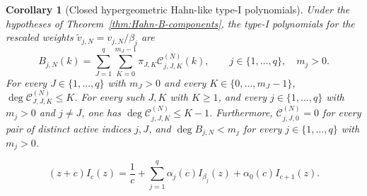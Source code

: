 \documentclass[10pt,a4paper]{amsart}
\newtheorem{corollary}{Corollary}
\begin{document}
\begin{corollary}[Closed hypergeometric Hahn-like type-I polynomials]
\label{cor:Hahn-B-closed-components}
Under the hypotheses of Theorem~\ref{thm:Hahn-B-components}, the type-I
polynomials for the rescaled weights
\(\widetilde v_{j,N}=v_{j,N}/\beta_j\) are
\begin{equation}
 B_{j,N}(k)=
 \sum_{J=1}^q\sum_{K=0}^{m_J-1}
 \pi_{J,K}\mathcal C_{j,J,K}^{(N)}(k),
 \qquad j\in\{1,\ldots,q\},\quad m_j>0.
 \label{eq:Hahn-B-closed-components}
\end{equation}
For every \(J\in\{1,\ldots,q\}\) with \(m_J>0\) and every
\(K\in\{0,\ldots,m_J-1\}\),
\(\deg \mathcal C_{J,J,K}^{(N)}\le K\). For every such \(J,K\) with
\(K\ge1\), and every \(j\in\{1,\ldots,q\}\) with \(m_j>0\) and
\(j\ne J\), one has \(\deg \mathcal C_{j,J,K}^{(N)}\le K-1\).
Furthermore, \(\mathcal C_{j,J,0}^{(N)}=0\) for every pair of distinct
active indices \(j,J\), and \(\deg B_{j,N}<m_j\) for every
\(j\in\{1,\ldots,q\}\) with \(m_j>0\).
\end{corollary}

\begin{equation}
 (z+c)I_c(z)=\frac1c+
 \sum_{j=1}^q\alpha_j(c)I_{\beta_j}(z)
 +\alpha_0(c)I_{c+1}(z).
 \label{eq:Hahn-Cauchy-contiguous-recurrence}
\end{equation}
\end{document}
